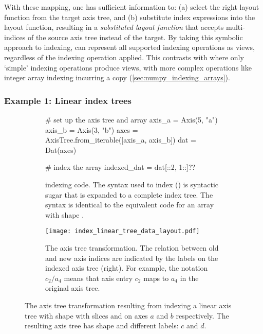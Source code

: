 \documentclass[thesis]{subfiles}
\begin{document}
With these mapping, one has sufficient information to:
(a) select the right layout function from the target axis tree, and
(b) substitute index expressions into the layout function, resulting in a \emph{substituted layout function} that accepts multi-indices of the source axis tree instead of the target.
By taking this symbolic approach to indexing,  can represent all supported indexing operations as views, regardless of the indexing operation applied.
This contrasts with \numpy{} where only `simple' indexing operations produce views, with more complex operations like integer array indexing incurring a copy (\cref{sec:numpy_indexing_arrays}).

\subsubsection{Example 1: Linear index trees} \label{example:linear_index_tree}

\begin{figure}
  \centering
  \begin{subfigure}{.9\textwidth}
    \begin{pyalg2}
      # set up the axis tree and array
      axis_a = Axis(5, "a")
      axis_b = Axis(3, "b")
      axes = AxisTree.from_iterable([axis_a, axis_b])
      dat = Dat(axes)

      # index the array
      indexed_dat = dat[::2, 1::]?\label{code:index_linear_apply}?
    \end{pyalg2}

    \caption{
       indexing code.
      The syntax used to index  (\pycode{[::2, 1::]}) is syntactic sugar that is expanded to a complete index tree.
      The syntax is identical to the equivalent \numpy{} code for an array with shape .
    }
    \label{fig:index_linear_code}
  \end{subfigure}

  \vspace{1em}

  \begin{subfigure}{\textwidth}
    \centering
    \texttt{[image: index\_linear\_tree\_data\_layout.pdf]}
    \caption{
      The axis tree transformation.
      The relation between old and new axis indices are indicated by the labels on the indexed axis tree (right).
      For example, the notation $c_2/a_4$ means that axis entry $c_2$ maps to $a_4$ in the original axis tree.
    }
    \label{fig:index_linear_transform}
  \end{subfigure}

  \caption{
    The axis tree transformation resulting from indexing a linear axis tree with shape  with slices \pycode{[::2]} and \pycode{[1::]} on axes $a$ and $b$ respectively.
    The resulting axis tree has shape  and different labels: $c$ and $d$.
  }
  \label{fig:index_linear}
\end{figure}
\end{document}
